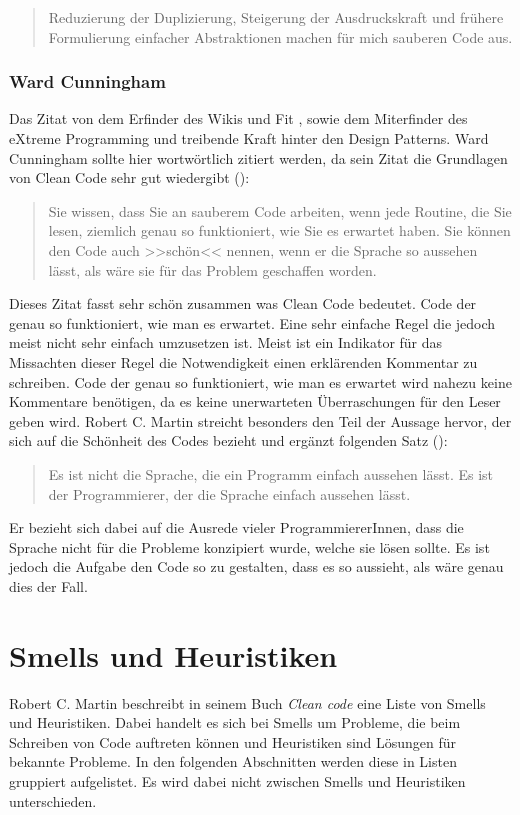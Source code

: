 \begin{quotation}
Reduzierung der Duplizierung, Steigerung der Ausdruckskraft und frühere Formulierung einfacher Abstraktionen machen für mich sauberen Code aus.
\end{quotation}

\subsubsection{Ward Cunningham}
Das Zitat von dem Erfinder des Wikis \cite{Wiki2016} und Fit \cite{Fit2016}, sowie dem Miterfinder des eXtreme Programming und treibende Kraft hinter den Design Patterns. Ward Cunningham sollte hier wortwörtlich zitiert werden, da sein Zitat die Grundlagen von Clean Code sehr gut wiedergibt (\cite[Seite 39]{Martin2008}):

\begin{quotation}
	Sie wissen, dass Sie an sauberem Code arbeiten, wenn jede Routine, die Sie lesen, ziemlich genau so funktioniert, wie Sie es erwartet haben. Sie können den Code auch >>schön<< nennen, wenn er die Sprache so aussehen lässt, als wäre sie für das Problem geschaffen worden.
\end{quotation}

Dieses Zitat fasst sehr schön zusammen was Clean Code bedeutet. Code der genau so funktioniert, wie man es erwartet. Eine sehr einfache Regel die jedoch meist nicht sehr einfach umzusetzen ist. Meist ist ein Indikator für das Missachten dieser Regel die Notwendigkeit einen erklärenden Kommentar zu schreiben. Code der genau so funktioniert, wie man es erwartet wird nahezu keine Kommentare benötigen, da es keine unerwarteten Überraschungen für den Leser geben wird. Robert C. Martin streicht besonders den Teil der Aussage hervor, der sich auf die Schönheit des Codes bezieht und ergänzt folgenden Satz  (\cite[Seite 40]{Martin2008}):

\begin{quotation}
Es ist nicht die Sprache, die ein Programm einfach aussehen lässt. Es ist der Programmierer, der die Sprache einfach aussehen lässt.
\end{quotation}

Er bezieht sich dabei auf die Ausrede vieler ProgrammiererInnen, dass die Sprache nicht für die Probleme konzipiert wurde, welche sie lösen sollte. Es ist jedoch die Aufgabe den Code so zu gestalten, dass es so aussieht, als wäre genau dies der Fall.

\newpage
\section{Smells und Heuristiken}
Robert C. Martin beschreibt in seinem Buch \textit{Clean code} \cite{Martin2008} eine Liste von Smells und Heuristiken. Dabei handelt es sich bei Smells um Probleme, die beim Schreiben von Code auftreten können und Heuristiken sind Lösungen für bekannte Probleme. In den folgenden Abschnitten werden diese in Listen gruppiert aufgelistet. Es wird dabei nicht zwischen Smells und Heuristiken unterschieden. 

